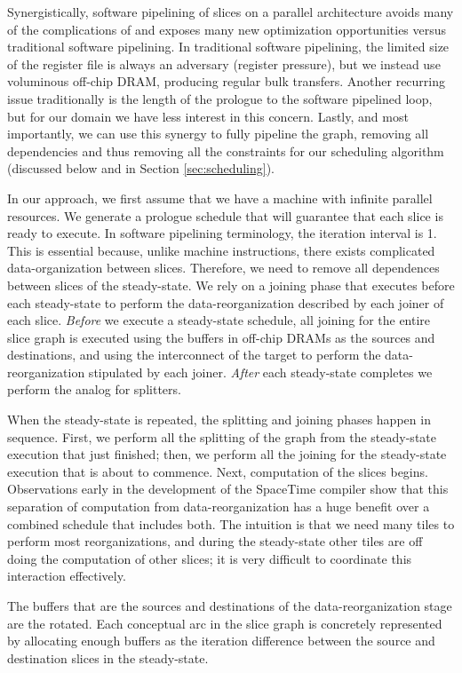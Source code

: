 Synergistically, software pipelining of slices on a parallel
architecture avoids many of the complications of and exposes many new
optimization opportunities versus traditional software pipelining.  In
traditional software pipelining, the limited size of the register file
is always an adversary (register pressure), but we instead use
voluminous off-chip DRAM, producing regular bulk transfers.  Another
recurring issue traditionally is the length of the prologue to the
software pipelined loop, but for our domain we have less interest in
this concern.  Lastly, and most importantly, we can use this synergy
to fully pipeline the graph, removing all dependencies and thus
removing all the constraints for our scheduling algorithm (discussed
below and in Section \ref{sec:scheduling}).

In our approach, we first assume that we have a machine with infinite
parallel resources.  We generate a prologue schedule that will
guarantee that each slice is ready to execute.  In software pipelining
terminology, the iteration interval is 1.  This is essential because,
unlike machine instructions, there exists complicated
data-organization between slices.  Therefore, we need to remove all
dependences between slices of the steady-state.  We rely on a joining
phase that executes before each steady-state to perform the
data-reorganization described by each joiner of each slice.  {\it
Before} we execute a steady-state schedule, all joining for the entire
slice graph is executed using the buffers in off-chip DRAMs as the
sources and destinations, and using the interconnect of the target to
perform the data-reorganization stipulated by each joiner.  {\it
After} each steady-state completes we perform the analog for
splitters.

When the steady-state is repeated, the splitting and joining phases
happen in sequence.  First, we perform all the splitting of the graph
from the steady-state execution that just finished; then, we perform
all the joining for the steady-state execution that is about to
commence. Next, computation of the slices begins.  Observations early
in the development of the SpaceTime compiler show that this separation
of computation from data-reorganization has a huge benefit over a
combined schedule that includes both.  The intuition is that we need
many tiles to perform most reorganizations, and during the
steady-state other tiles are off doing the computation of other
slices; it is very difficult to coordinate this interaction
effectively.

The buffers that are the sources and destinations of the
data-reorganization stage are the rotated.  Each conceptual arc in the
slice graph is concretely represented by allocating enough buffers as
the iteration difference between the source and destination slices in
the steady-state.


